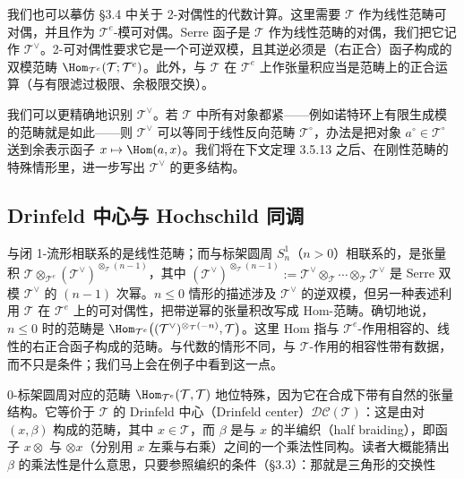 我们也可以摹仿 §3.4 中关于 2-对偶性的代数计算。这里需要 $\mathcal{T}$ 作为线性范畴可对偶，并且作为 $\mathcal{T}^e$-模可对偶。Serre 函子是 $\mathcal{T}$ 作为线性范畴的对偶，我们把它记作 $\mathcal{T}^\vee$。2-可对偶性要求它是一个可逆双模，且其逆必须是（右正合）函子构成的双模范畴 $\Hom_{\mathcal{T}^e}(\mathcal{T};\mathcal{T}^e)$。此外，与 $\mathcal{T}$ 在 $\mathcal{T}^e$ 上作张量积应当是范畴上的正合运算（与有限滤过极限、余极限交换）。

我们可以更精确地识别 $\mathcal{T}^\vee$。若 $\mathcal{T}$ 中所有对象都紧——例如诺特环上有限生成模的范畴就是如此——则 $\mathcal{T}^\vee$ 可以等同于线性反向范畴 $\mathcal{T}^\circ$，办法是把对象 $a^\circ\in\mathcal{T}^\circ$ 送到余表示函子 $x\mapsto\Hom(a,x)$。我们将在下文定理 3.5.13 之后、在刚性范畴的特殊情形里，进一步写出 $\mathcal{T}^\vee$ 的更多结构。

\subsection{Drinfeld 中心与 Hochschild 同调}

与闭 1-流形相联系的是线性范畴；而与标架圆周 $S^1_n$（$n>0$）相联系的，是张量积 $\mathcal{T}\otimes_{\mathcal{T}^e}(\mathcal{T}^\vee)^{\otimes_{\mathcal{T}}(n-1)}$，其中 $(\mathcal{T}^\vee)^{\otimes_{\mathcal{T}}(n-1)}:=\mathcal{T}^\vee\otimes_{\mathcal{T}}\cdots\otimes_{\mathcal{T}}\mathcal{T}^\vee$ 是 Serre 双模 $\mathcal{T}^\vee$ 的 $(n-1)$ 次幂。$n\le 0$ 情形的描述涉及 $\mathcal{T}^\vee$ 的逆双模，但另一种表述利用 $\mathcal{T}$ 在 $\mathcal{T}^e$ 上的可对偶性，把带逆幂的张量积改写成 Hom-范畴。确切地说，$n\le 0$ 时的范畴是 $\Hom_{\mathcal{T}^e}\bigl((\mathcal{T}^\vee)^{\otimes_{\mathcal{T}}(-n)},\mathcal{T}\bigr)$。这里 Hom 指与 $\mathcal{T}^e$-作用相容的、线性的右正合函子构成的范畴。与代数的情形不同，与 $\mathcal{T}$-作用的相容性带有数据，而不只是条件；我们马上会在例子中看到这一点。

0-标架圆周对应的范畴 $\Hom_{\mathcal{T}^e}(\mathcal{T},\mathcal{T})$ 地位特殊，因为它在合成下带有自然的张量结构。它等价于 $\mathcal{T}$ 的 Drinfeld 中心（Drinfeld center）$\mathcal{DC}(\mathcal{T})$：这是由对 $(x,\beta)$ 构成的范畴，其中 $x\in\mathcal{T}$，而 $\beta$ 是与 $x$ 的半编织（half braiding），即函子 $x\otimes$ 与 $\otimes x$（分别用 $x$ 左乘与右乘）之间的一个乘法性同构。读者大概能猜出 $\beta$ 的乘法性是什么意思，只要参照编织的条件（§3.3）：那就是三角形的交换性
\begin{center}
\end{center}

